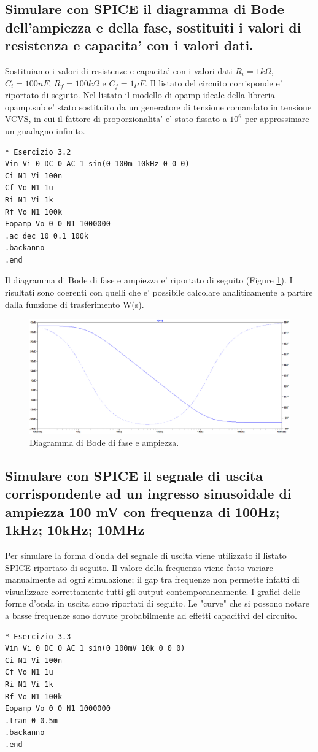 \documentclass[a4paper,10pt]{article}
\begin{document}
\subsection{Simulare con SPICE il diagramma di Bode dell'ampiezza e della fase, sostituiti i valori di resistenza e capacita' con i valori dati.}
Sostituiamo i valori di resistenze e capacita' con i valori dati $R_i=1k\Omega$, $C_i=100nF$, $R_f=100k\Omega$ e $C_f=1 \mu F$. Il listato del circuito corrisponde e' riportato di seguito. Nel listato il modello di opamp ideale della libreria opamp.sub e' stato sostituito da un generatore di tensione comandato in tensione VCVS, in cui il fattore di proporzionalita' e' stato fissato a $10^6$ per approssimare un guadagno infinito.
\begin{verbatim}
* Esercizio 3.2
Vin Vi 0 DC 0 AC 1 sin(0 100m 10kHz 0 0 0)
Ci N1 Vi 100n
Cf Vo N1 1u
Ri N1 Vi 1k
Rf Vo N1 100k
Eopamp Vo 0 0 N1 1000000
.ac dec 10 0.1 100k
.backanno
.end
\end{verbatim}    	
Il diagramma di Bode di fase e ampiezza e' riportato di seguito (Figure \ref{fig:bode3}). I risultati sono coerenti con quelli che e' possibile calcolare analiticamente a partire dalla funzione di trasferimento W(s). 

\begin{figure}[h!]
	\centering
 	\includegraphics[width=1\linewidth]{plot3-1.png}
  	\caption{Diagramma di Bode di fase e ampiezza.}
  	\label{fig:bode3}
\end{figure}
\pagebreak

\subsection{Simulare con SPICE il segnale di uscita corrispondente ad un ingresso sinusoidale di ampiezza 100 mV con frequenza di 100Hz; 1kHz; 10kHz; 10MHz}
Per simulare la forma d'onda del segnale di uscita viene utilizzato il listato SPICE riportato di seguito. Il valore della frequenza viene fatto variare manualmente ad ogni simulazione; il gap tra frequenze non permette infatti di visualizzare correttamente tutti gli output contemporaneamente. I grafici delle forme d'onda in uscita sono riportati di seguito. Le "curve" che si possono notare a basse frequenze sono dovute probabilmente ad effetti capacitivi del circuito. 
\begin{verbatim}
* Esercizio 3.3
Vin Vi 0 DC 0 AC 1 sin(0 100mV 10k 0 0 0)
Ci N1 Vi 100n
Cf Vo N1 1u
Ri N1 Vi 1k
Rf Vo N1 100k
Eopamp Vo 0 0 N1 1000000
.tran 0 0.5m
.backanno
.end
\end{verbatim}
\end{document}
